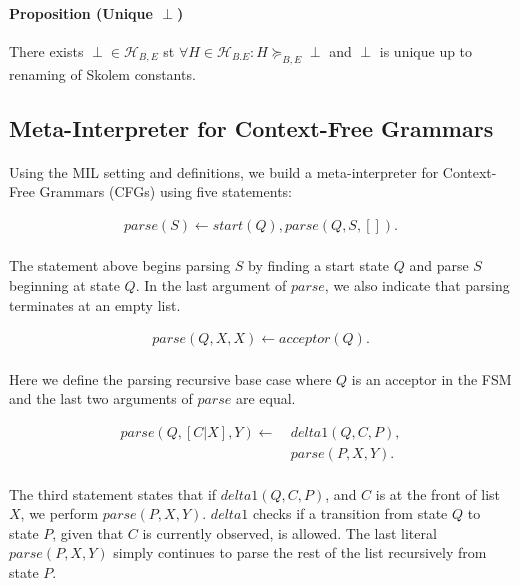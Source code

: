 \documentclass{article}
\theoremstyle{plain}
\theoremstyle{definition}
\begin{document}
\begin{multicols}{2}
\paragraph{Proposition (Unique $\perp$)} There exists $\perp \in \mathcal{H}_{B,E}$ st $\forall H \in \mathcal{H}_{B.E}: H \succeq_{B,E} \perp$ and $\perp$ is unique up to renaming of Skolem constants.

\subsection{Meta-Interpreter for Context-Free Grammars}

\paragraph{} Using the MIL setting and definitions, we build a meta-interpreter for Context-Free Grammars (CFGs) using five statements:

\begin{align*}
parse(S) \leftarrow start(Q), parse(Q, S, []).
\end{align*}

\paragraph{} The statement above begins parsing $S$ by finding a start state $Q$ and parse $S$ beginning at state $Q$. In the last argument of $parse$, we also indicate that parsing terminates at an empty list.

\begin{align*}
parse(Q, X, X) \leftarrow acceptor(Q).
\end{align*}

\paragraph{} Here we define the parsing recursive base case where $Q$ is an acceptor in the FSM and the last two arguments of $parse$ are equal.

\begin{align*}
parse(Q, [C|X], Y) \leftarrow\ &delta1(Q, C, P),\\ &parse(P, X, Y).
\end{align*}

\paragraph{} The third statement states that if $delta1(Q, C, P)$, and $C$ is at the front of list $X$, we perform $parse(P, X, Y)$. $delta1$ checks if a transition from state $Q$ to state $P$, given that $C$ is currently observed, is allowed. The last literal $parse(P, X, Y)$ simply continues to parse the rest of the list recursively from state $P$.


\end{multicols}
\end{document}
